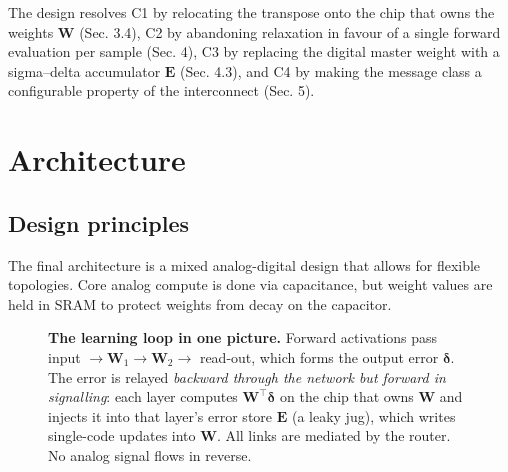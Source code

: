 \documentclass[11pt]{article}
\begin{document}
The design resolves C1 by relocating the transpose onto the chip that
owns the weights \(\bm W\) (Sec. 3.4), C2 by abandoning relaxation in
favour of a single forward evaluation per sample (Sec. 4), C3 by
replacing the digital master weight with a sigma--delta accumulator
\(\bm E\) (Sec. 4.3), and C4 by making the message class a configurable
property of the interconnect (Sec. 5).

\hypertarget{sec:arch}{%
\section{Architecture}\label{sec:arch}}

\hypertarget{design-principles}{%
\subsection{Design principles}\label{design-principles}}

The final architecture is a mixed analog-digital design that allows for
flexible topologies. Core analog compute is done via capacitance, but
weight values are held in SRAM to protect weights from decay on the
capacitor.

\begin{figure}[t]
\centering
{}
\caption{\textbf{The learning loop in one picture.} Forward activations pass
input $\to \bm W_1 \to \bm W_2 \to$ read-out, which forms the output error
$\bm\delta$. The error is relayed \emph{backward through the network but forward
in signalling}: each layer computes $\bm W^{\!\top}\bm\delta$ on the chip that
owns $\bm W$ and injects it into that layer's error store $\bm E$ (a leaky jug),
which writes single-code updates into $\bm W$. All links are mediated by the
router. No analog signal flows in reverse.}
\label{fig:overview}
\end{figure}
\end{document}
